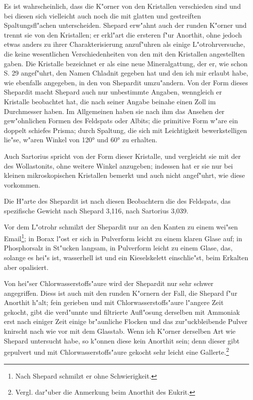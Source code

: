 \documentclass[a4paper, 11pt, oneside]{article}
\begin{document}
Es ist wahrscheinlich, dass die K"orner von den Kristallen verschieden sind und bei diesen sich vielleicht auch noch die mit glatten und gestreiften Spaltungsfl"achen unterscheiden. Shepard erw"ahnt auch der runden K"orner und trennt sie von den Kristallen; er erkl"art die ersteren f"ur Anorthit, ohne jedoch etwas anders zu ihrer Charakterisierung anzuf"uhren als einige L"otrohrversuche, die keine wesentlichen Verschiedenheiten von den mit den Kristallen angestellten gaben. Die Kristalle bezeichnet er als eine neue Mineralgattung, der er, wie schon S. 29 angef"uhrt, den Namen Chladnit gegeben hat und den ich mir erlaubt habe, wie ebenfalls angegeben, in den von Shepardit umzu"andern. Von der Form dieses Shepardit macht Shepard auch nur unbestimmte Angaben, wenngleich er Kristalle beobachtet hat, die nach seiner Angabe beinahe einen Zoll im Durchmesser haben. Im Allgemeinen haben sie nach ihm das Ansehen der gew"ohnlichen Formen des Feldspats oder Albits; die primitive Form w"are ein doppelt schiefes Prisma; durch Spaltung, die sich mit Leichtigkeit bewerkstelligen lie"se, w"aren Winkel von 120° und 60° zu erhalten.

Auch Sartorius spricht von der Form dieser Kristalle, und vergleicht sie mit der des Wollastonits, ohne weitere Winkel anzugeben; indessen hat er sie nur bei kleinen mikroskopischen Kristallen bemerkt und auch nicht angef"uhrt, wie diese vorkommen.

Die H"arte des Shepardit ist nach diesen Beobachtern die des Feldspats, das spezifische Gewicht nach Shepard 3,116, nach Sartorius 3,039.

Vor dem L"otrohr schmilzt der Shepardit nur an den Kanten zu einem wei"sen Email\footnote{Nach Shepard schmilzt er ohne Schwierigkeit.}; in Borax l"ost er sich in Pulverform leicht zu einem klaren Glase auf; in Phosphorsalz in St"ucken langsam, in Pulverform leicht zu einem Glase, das, solange es hei"s ist, wasserhell ist und ein Kieselskelett einschlie"st, beim Erkalten aber opalisiert.

Von hei"ser Chlorwasserstoffs"aure wird der Shepardit nur sehr schwer angegriffen. Diess ist auch mit den runden K"ornern der Fall, die Shepard f"ur Anorthit h"alt; fein gerieben und mit Chlorwasserstoffs"aure l"angere Zeit gekocht, gibt die verd"unnte und filtrierte Aufl"osung derselben mit Ammoniak erst nach einiger Zeit einige br"aunliche Flocken und das zur"uckbleibende Pulver knirscht nach wie vor mit dem Glasstab. Wenn ich K"orner derselben Art wie Shepard untersucht habe, so k"onnen diese kein Anorthit sein; denn dieser gibt gepulvert und mit Chlorwasserstoffs"aure gekocht sehr leicht eine Gallerte.\footnote{Vergl. dar"uber die Anmerkung beim Anorthit des Eukrit.}
\end{document}
